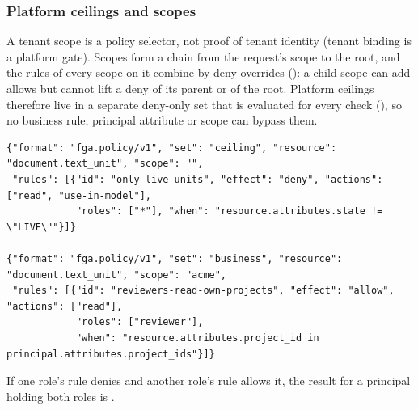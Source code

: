 \subsubsection{Platform ceilings and scopes}
A tenant scope is a policy selector, not proof of tenant identity (tenant binding is a platform gate). Scopes form a chain from the request's scope to the root, and the rules of every scope on it combine by deny-overrides (): a child scope can add allows but cannot lift a deny of its parent or of the root. Platform ceilings therefore live in a separate deny-only set that is evaluated for every check (), so no business rule, principal attribute or scope can bypass them.
\begin{lstlisting}
{"format": "fga.policy/v1", "set": "ceiling", "resource": "document.text_unit", "scope": "",
 "rules": [{"id": "only-live-units", "effect": "deny", "actions": ["read", "use-in-model"],
            "roles": ["*"], "when": "resource.attributes.state != \"LIVE\""}]}

{"format": "fga.policy/v1", "set": "business", "resource": "document.text_unit", "scope": "acme",
 "rules": [{"id": "reviewers-read-own-projects", "effect": "allow", "actions": ["read"],
            "roles": ["reviewer"],
            "when": "resource.attributes.project_id in principal.attributes.project_ids"}]}
\end{lstlisting}
If one role's rule denies  and another role's rule allows it, the result for a principal holding both roles is .

